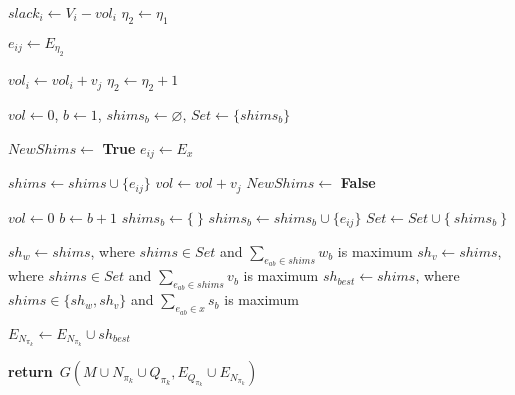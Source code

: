 \documentclass[preprint]{elsarticle}
\renewcommand{\Return}{\State \textbf{return}~}
\begin{document}
\begin{algorithm}[H]
\begin{algorithmic}[1]
			\State $slack_i \gets V_i - vol_i$  \label{shims:beginsecond}
			\State $\eta_2 \gets \eta_1$  \label{shims:eta2a}

					\State $e_{ij} \gets E_{\eta_2}$
			
					\State $vol_i \gets vol_i + v_j$
					\State $\eta_2 \gets \eta_2 + 1$  \label{shims:eta2} \label{shims:endsecond} 
			\EndWhile 
				
			
			\State $vol \gets 0$, $b \gets 1$, $shims_b \gets \varnothing$, {\color{blue} $Set \gets \{ shims_b \}$ } \label{shims:beginthird} 
			
		
			
			 \label{edges_indexes}
				
				  
				\EndIf
			
				\State $NewShims \gets$ {\bf True} \label{new_shims}
				\State $e_{ij} \gets E_x$
				
				 \label{shims_set}
				
					
						\State $shims \gets shims \cup \{e_{ij}\}$
						\State $vol \gets vol + v_j$
						\State $NewShims \gets$ {\bf False} \label{new_shims_false}
						
					\EndIf
				
				\EndFor 
			
				 \label{new_shims2}
					\State $vol \gets 0$
					\State $b \gets b + 1$
					\State $shims_b \gets \{\ \}$
					\State $shims_b \gets shims_b \cup \{e_{ij}\}$
					\State $Set \gets Set \cup \{\ shims_b\ \}$
				\EndIf
			
			\EndFor 
			
			\State $sh_w \gets shims$, where $shims \in Set$ and $\sum_{e_{ab} \in shims} w_b$ is maximum  \label{best_weight}		
			\State $sh_v \gets shims$, where $shims \in Set$ and $\sum_{e_{ab} \in shims} v_b$ is maximum \label{best_volume}
			\State $sh_{best} \gets shims$, where $shims \in \{sh_w, sh_v\}$ and $\sum_{e_{ab} \in x} s_b$ is maximum \label{best_score}
			
			\State $E_{N_{\pi_k}} \gets E_{N_{\pi_k}} \cup sh_{best}$ 	\label{shims:endthird}   

		\EndFor
		
		\Return $G(M \cup N_{\pi_k} \cup Q_{\pi_k}, E_{Q_{\pi_k}} \cup E_{N_{\pi_k}})$
		
		\EndProcedure
	\end{algorithmic}
\end{algorithm}
\end{document}
